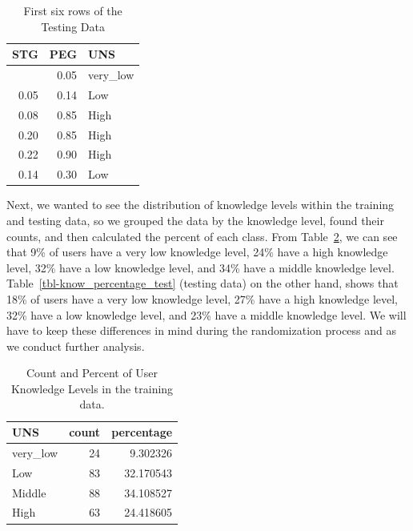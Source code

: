 \documentclass[
  letterpaper,
  DIV=11,
  numbers=noendperiod]{scrartcl}
\begin{document}
\begin{longtable}[]{@{}rrl@{}}

\caption{\label{tbl-knowledge_test_data}First six rows of the Testing
Data}

\tabularnewline

\toprule\noalign{}
STG & PEG & UNS \\
\midrule\noalign{}
\endhead
\bottomrule\noalign{}
\endlastfoot
0.00 & 0.05 & very\_low \\
0.05 & 0.14 & Low \\
0.08 & 0.85 & High \\
0.20 & 0.85 & High \\
0.22 & 0.90 & High \\
0.14 & 0.30 & Low \\

\end{longtable}

Next, we wanted to see the distribution of knowledge levels within the
training and testing data, so we grouped the data by the knowledge
level, found their counts, and then calculated the percent of each
class. From Table~\ref{tbl-know_percentage_train}, we can see that 9\%
of users have a very low knowledge level, 24\% have a high knowledge
level, 32\% have a low knowledge level, and 34\% have a middle knowledge
level. Table~\ref{tbl-know_percentage_test} (testing data) on the other
hand, shows that 18\% of users have a very low knowledge level, 27\%
have a high knowledge level, 32\% have a low knowledge level, and 23\%
have a middle knowledge level. We will have to keep these differences in
mind during the randomization process and as we conduct further
analysis.

\begin{longtable}[]{@{}lrr@{}}

\caption{\label{tbl-know_percentage_train}Count and Percent of User
Knowledge Levels in the training data.}

\tabularnewline

\toprule\noalign{}
UNS & count & percentage \\
\midrule\noalign{}
\endhead
\bottomrule\noalign{}
\endlastfoot
very\_low & 24 & 9.302326 \\
Low & 83 & 32.170543 \\
Middle & 88 & 34.108527 \\
High & 63 & 24.418605 \\

\end{longtable}
\end{document}
